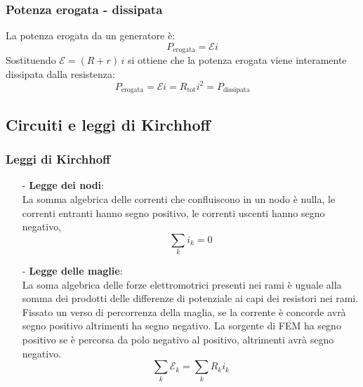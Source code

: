\documentclass[a4paper]{article}
\begin{document}
\subsubsection*{Potenza erogata - dissipata}
La potenza erogata da un generatore è: \[\qquad P_\text{erogata} = \mathcal{E} i\]
Sostituendo \(\mathcal{E} = (R + r) \, i\) si ottiene che la potenza erogata viene interamente dissipata dalla resistenza:
\[P_\text{erogata} = \mathcal{E} i = R_\text{tot} i^2 = P_\text{dissipata}\]

\vspace{10pt}

\subsection{Circuiti e leggi di Kirchhoff}
\subsubsection*{Leggi di Kirchhoff}
\begin{itemize}
	\item[-] \textbf{Legge dei nodi}: \\
	La somma algebrica delle correnti che confluiscono in un nodo è nulla, le correnti entranti hanno segno	positivo, le correnti
	uscenti hanno segno negativo, \[\sum_k i_k = 0\]
	\item[-] \textbf{Legge delle maglie}: \\
	La soma algebrica delle forze elettromotrici presenti nei rami è uguale alla somma dei prodotti delle differenze di potenziale
	ai capi dei resistori nei rami. Fissato un verso di percorrenza della maglia, se la corrente è concorde avrà segno positivo
	altrimenti ha segno negativo. La sorgente di FEM ha segno positivo se è percorsa da polo negativo al positivo, altrimenti avrà
	segno negativo. \[\sum_k \mathcal{E}_k = \sum_k R_k i_k\]
\end{itemize}

\newpage
\end{document}
